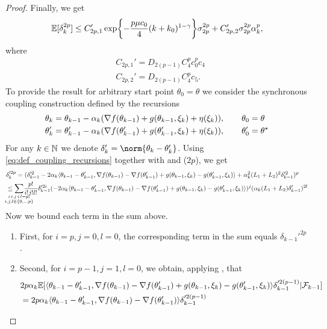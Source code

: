 \begin{proof}
Finally, we get 
\begin{equation}
    \mathbb{E}[\delta_k^{2p}]\leq C_{2p, 1}'\exp\biggl\{-\frac{p\mu c_0}{4}(k+k_0)^{1-\gamma}\biggr\}\sigma_{2p}^{2p} + C_{2p, 2}'\sigma_{2p}^{2p}\alpha_k^p,
\end{equation}
where 
\begin{align}
    &C_{2p, 1}' = D_{2(p-1)}C_4^pc_0^pc_4\\&
    C_{2p, 2}' = D_{2(p-1)}C_4^pc_5.
\end{align}
To provide the result for arbitrary start point $\theta_0=\theta$ we consider the synchronous coupling construction defined by the recursions
\begin{align}
\label{eq:def_coupling_recursions}
    &\theta_k = \theta_{k-1} - \alpha_k(\nabla f(\theta_{k-1})+g(\theta_{k-1}, \xi_k) + \eta(\xi_k)), \qquad \theta_0=\theta\\&
    \theta_k' = \theta_{k-1}' - \alpha_k(\nabla f(\theta_{k-1}')+g(\theta_{k-1}', \xi_k) + \eta(\xi_k)), \qquad \theta_0'=\theta^\star
\end{align}
For any $k\in \mathbb{N}$ we denote $\delta_{k}' = \norm{\theta_k - \theta_k'}$. Using \eqref{eq:def_coupling_recursions} together with  and ($2p$), we get 
\begin{align}
    &\delta_k'^{2p} = (\delta_{k-1}'^2 - 2\alpha_k\langle \theta_{k-1} - \theta_{k-1}', \nabla f(\theta_{k-1}) - \nabla f(\theta_{k-1}') + g(\theta_{k-1}, \xi_k) - g(\theta_{k-1}', \xi_k) \rangle + \alpha_k^2(L_1+L_2)^2\delta_{k-1}'^2)^p\\&\leq \underset{\mathclap{\substack{i+j+l=p;\\ i,j,l \in \{0,\ldots p\}}}}{\sum}\frac{p!}{i!j!l!}\delta_{k-1}'^{2i}(- 2\alpha_k\langle \theta_{k-1} - \theta_{k-1}', \nabla f(\theta_{k-1}) - \nabla f(\theta_{k-1}') + g(\theta_{k-1}, \xi_k) - g(\theta_{k-1}', \xi_k) \rangle)^{j}(\alpha_k(L_1+L_2)\delta_{k-1}')^{2l}
\end{align}
Now we bound each term in the sum above.
\begin{enumerate}
        \item First, for $i=p, j=0, l=0$, the corresponding term in the sum equals $\delta_{k-1}'^{2p}$.
        \item Second, for $i=p-1, j=1, l=0$, we obtain, applying , that 
        \begin{align}
        &2p\alpha_k \PE [\langle\theta_{k-1}-\theta_{k-1}', \nabla f(\theta_{k-1}) -\nabla f(\theta_{k-1}') +g(\theta_{k-1}, \xi_k) - g(\theta_{k-1}', \xi_k) \rangle\delta_{k-1}'^{2(p-1)}|\F_{k-1}] \\ &= 2p\alpha_k\langle\theta_{k-1}-\theta_{k-1}', \nabla f(\theta_{k-1})- \nabla f(\theta_{k-1}')  \rangle\delta_{k-1}'^{2(p-1)} 

\end{align}
\end{enumerate}
\end{proof}
